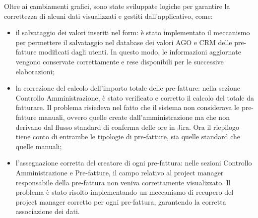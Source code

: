     Oltre ai cambiamenti grafici, sono state sviluppate logiche per garantire la correttezza di alcuni dati
    visualizzati e gestiti dall’applicativo, come:
    \begin{itemize}
        \item il salvataggio dei valori inseriti nel form: è stato implementato il meccanismo per permettere il salvataggio
        nel database dei valori AGO e CRM delle pre-fatture modificati dagli utenti. In questo modo, le informazioni
        aggiornate vengono conservate correttamente e rese disponibili per le successive elaborazioni;
        \item la correzione del calcolo dell’importo totale delle pre-fatture: nella sezione Controllo Amministrazione, è
        stato verificato e corretto il calcolo del totale da fatturare. Il problema risiedeva nel fatto che il sistema
        non considerava le pre-fatture manuali, ovvero quelle create dall’amministrazione ma che non
        derivano dal flusso standard di conferma delle ore in Jira. Ora il riepilogo tiene conto di entrambe le tipologie
        di pre-fatture, sia quelle standard che quelle manuali;
        \item l'assegnazione corretta del creatore di ogni pre-fattura: nelle sezioni Controllo Amministrazione e Pre-fatture,
        il campo relativo al project manager responsabile della pre-fattura non veniva correttamente visualizzato.
        Il problema è stato risolto implementando un meccanismo di recupero del project
        manager corretto per ogni pre-fattura, garantendo la corretta associazione dei dati.
    \end{itemize}